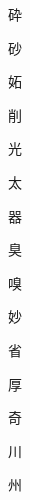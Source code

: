 \begin{spacing}{2.5}
{\Huge \begin{CJK}{UTF8}{min} 砕\end{CJK}}\hspace{0.1cm}
{\Huge \begin{CJK}{UTF8}{min} 砂\end{CJK}}\hspace{0.1cm}
{\Huge \begin{CJK}{UTF8}{min} 妬\end{CJK}}\hspace{0.1cm}
{\Huge \begin{CJK}{UTF8}{min} 削\end{CJK}}\hspace{0.1cm}
{\Huge \begin{CJK}{UTF8}{min} 光\end{CJK}}\hspace{0.1cm}
{\Huge \begin{CJK}{UTF8}{min} 太\end{CJK}}\hspace{0.1cm}
{\Huge \begin{CJK}{UTF8}{min} 器\end{CJK}}\hspace{0.1cm}
{\Huge \begin{CJK}{UTF8}{min} 臭\end{CJK}}\hspace{0.1cm}
{\Huge \begin{CJK}{UTF8}{min} 嗅\end{CJK}}\hspace{0.1cm}
{\Huge \begin{CJK}{UTF8}{min} 妙\end{CJK}}\hspace{0.1cm}
{\Huge \begin{CJK}{UTF8}{min} 省\end{CJK}}\hspace{0.1cm}
{\Huge \begin{CJK}{UTF8}{min} 厚\end{CJK}}\hspace{0.1cm}
{\Huge \begin{CJK}{UTF8}{min} 奇\end{CJK}}\hspace{0.1cm}
{\Huge \begin{CJK}{UTF8}{min} 川\end{CJK}}\hspace{0.1cm}
{\Huge \begin{CJK}{UTF8}{min} 州\end{CJK}}\hspace{0.1cm}

\end{spacing}
